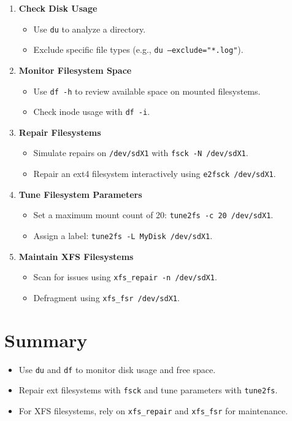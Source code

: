 \documentclass[a4paper]{report}
\begin{document}
\begin{enumerate}
    \item \textbf{Check Disk Usage}
    \begin{itemize}
        \item Use \texttt{du} to analyze a directory.
        \item Exclude specific file types (e.g., \texttt{du --exclude="*.log"}).
    \end{itemize}
    \item \textbf{Monitor Filesystem Space}
    \begin{itemize}
        \item Use \texttt{df -h} to review available space on mounted filesystems.
        \item Check inode usage with \texttt{df -i}.
    \end{itemize}
    \item \textbf{Repair Filesystems}
    \begin{itemize}
        \item Simulate repairs on \texttt{/dev/sdX1} with \texttt{fsck -N /dev/sdX1}.
        \item Repair an ext4 filesystem interactively using \texttt{e2fsck /dev/sdX1}.
    \end{itemize}
    \item \textbf{Tune Filesystem Parameters}
    \begin{itemize}
        \item Set a maximum mount count of 20: \texttt{tune2fs -c 20 /dev/sdX1}.
        \item Assign a label: \texttt{tune2fs -L MyDisk /dev/sdX1}.
    \end{itemize}
    \item \textbf{Maintain XFS Filesystems}
    \begin{itemize}
        \item Scan for issues using \texttt{xfs\_repair -n /dev/sdX1}.
        \item Defragment using \texttt{xfs\_fsr /dev/sdX1}.
    \end{itemize}
\end{enumerate}

\section*{Summary}
\begin{itemize}
    \item Use \texttt{du} and \texttt{df} to monitor disk usage and free space.
    \item Repair ext filesystems with \texttt{fsck} and tune parameters with \texttt{tune2fs}.
    \item For XFS filesystems, rely on \texttt{xfs\_repair} and \texttt{xfs\_fsr} for maintenance.
\end{itemize}
\end{document}

